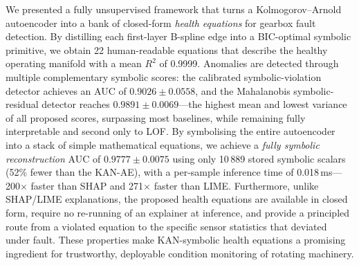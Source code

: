 \documentclass[conference]{IEEEtran}
\begin{document}
We presented a fully unsupervised framework that turns a
Kolmogorov--Arnold autoencoder into a bank of closed-form
\emph{health equations} for gearbox fault detection.
By distilling each first-layer B-spline edge into a
BIC-optimal symbolic primitive, we obtain 22 human-readable
equations that describe the healthy operating manifold with
a mean $R^2$ of 0.9999. Anomalies are detected through
multiple complementary symbolic scores: the calibrated symbolic-violation detector
achieves an AUC of $0.9026\pm0.0558$, and the Mahalanobis
symbolic-residual detector reaches \textbf{$0.9891\pm0.0069$}---the
highest mean and lowest variance of all proposed scores,
surpassing most baselines, while remaining fully
interpretable and second only to LOF.
By symbolising the entire
autoencoder into a stack of simple mathematical equations, we achieve a
\emph{fully symbolic reconstruction} AUC of $0.9777\pm0.0075$ using only
10\,889 stored symbolic scalars (52\% fewer than the KAN-AE), with a per-sample inference time of
0.018\,ms---200$\times$ faster than SHAP and 271$\times$ faster than
LIME. Furthermore, unlike SHAP/LIME explanations, the proposed health equations are available in closed form,
require no re-running of an explainer at inference, and
provide a principled route from a violated equation to the
specific sensor statistics that deviated under fault.
These properties make KAN-symbolic health equations a promising ingredient for
trustworthy, deployable condition monitoring of rotating
machinery.

\end{document}
